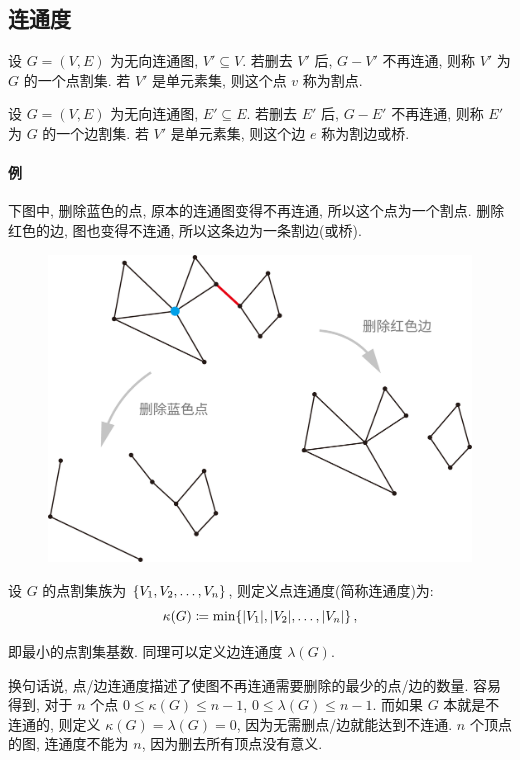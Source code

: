 \documentclass[UTF8]{ctexart}
\theoremstyle{mystyle}
\theoremstyle{myremark}
\theoremstyle{plain}
\DeclarePairedDelimiter\set{\{}{\}}
\begin{document}
\subsection{连通度}
\begin{definition}
    设 $ G = (V, E) $ 为无向连通图, $ V' \subseteq V $. 若删去 $ V' $ 后, $ G - V' $ 不再连通, 则称 $ V' $ 为 $ G $ 的一个点割集. 若 $ V' $ 是单元素集, 则这个点 $ v $ 称为割点.
\end{definition}

\begin{definition}
    设 $ G = (V, E) $ 为无向连通图, $ E' \subseteq E $. 若删去 $ E' $ 后, $ G - E' $ 不再连通, 则称 $ E' $ 为 $ G $ 的一个边割集. 若 $ V' $ 是单元素集, 则这个边 $ e $ 称为割边或桥.
\end{definition}

\paragraph{例}
下图中, 删除蓝色的点, 原本的连通图变得不再连通, 所以这个点为一个割点. 删除红色的边, 图也变得不连通, 所以这条边为一条割边(或桥).
\begin{figure}[H]
    \centering
    \includegraphics[width = 0.7\linewidth]{./images/bridge.png}
\end{figure}


\begin{definition}
    设 $ G $ 的点割集族为 $ \set{V_1, V_2, \dots, V_n} $, 则定义点连通度(简称连通度)为:
    \[ \kappa(G) \coloneqq \min\set{|V_1|, |V_2|, \dots, |V_n|} \,,\]

    即最小的点割集基数. 同理可以定义边连通度 $ \lambda(G) $.
\end{definition}

换句话说, 点/边连通度描述了使图不再连通需要删除的最少的点/边的数量. 容易得到, 对于 $ n $ 个点 $ 0 \leqslant \kappa(G) \leqslant n - 1 $, $ 0 \leqslant \lambda(G) \leqslant n - 1 $. 而如果 $ G $ 本就是不连通的, 则定义 $ \kappa(G) = \lambda(G) = 0 $, 因为无需删点/边就能达到不连通. $ n $ 个顶点的图, 连通度不能为 $ n $, 因为删去所有顶点没有意义.
\end{document}
